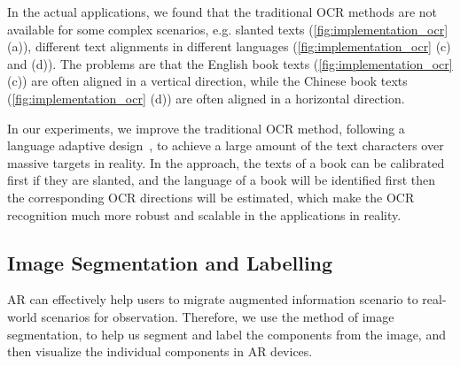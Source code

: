 In the actual applications,
we found that the traditional OCR methods are not available for some complex scenarios,
e.g. slanted texts (\autoref{fig:implementation_ocr} (a)), %
different text alignments in different languages (\autoref{fig:implementation_ocr} (c) and (d)).
The problems are that the English book texts (\autoref{fig:implementation_ocr} (c)) are often aligned in a vertical direction,
while the Chinese book texts (\autoref{fig:implementation_ocr} (d)) are often aligned in a horizontal direction.

In our experiments,
we improve the traditional OCR method, following a language adaptive design~\cite{Ling2018},
to achieve a large amount of the text characters over massive targets in reality.
In the approach, the texts of a book can be calibrated first if they are slanted,
and the language of a book will be identified first then the corresponding OCR
directions will be estimated,
which make the OCR recognition much more robust and scalable in the applications in reality.

%


\subsection{Image Segmentation and Labelling}

AR can effectively help users to migrate augmented information scenario
to real-world scenarios for observation.
Therefore, we use the method of image segmentation,
to help us segment and label the components from the image,
and then visualize the individual components in AR devices.

